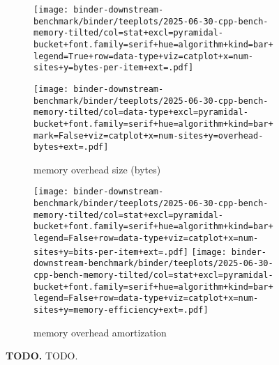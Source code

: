 \begin{figure}


\begin{subfigure}{\linewidth}
\centering
\texttt{[image: binder-downstream-benchmark/binder/teeplots/2025-06-30-cpp-bench-memory-tilted/col=stat+excl=pyramidal-bucket+font.family=serif+hue=algorithm+kind=bar+legend=True+row=data-type+viz=catplot+x=num-sites+y=bytes-per-item+ext=.pdf]}

\texttt{[image: binder-downstream-benchmark/binder/teeplots/2025-06-30-cpp-bench-memory-tilted/col=data-type+excl=pyramidal-bucket+font.family=serif+hue=algorithm+kind=bar+mark=False+viz=catplot+x=num-sites+y=overhead-bytes+ext=.pdf]}

\caption{memory overhead size (bytes)}
\end{subfigure}

\begin{subfigure}{\linewidth}
\texttt{[image: binder-downstream-benchmark/binder/teeplots/2025-06-30-cpp-bench-memory-tilted/col=stat+excl=pyramidal-bucket+font.family=serif+hue=algorithm+kind=bar+legend=False+row=data-type+viz=catplot+x=num-sites+y=bits-per-item+ext=.pdf]}%
\texttt{[image: binder-downstream-benchmark/binder/teeplots/2025-06-30-cpp-bench-memory-tilted/col=stat+excl=pyramidal-bucket+font.family=serif+hue=algorithm+kind=bar+legend=False+row=data-type+viz=catplot+x=num-sites+y=memory-efficiency+ext=.pdf]}
\caption{memory overhead amortization}
\end{subfigure}

\vspace{-2ex}

\caption{%
\textbf{TODO.}
\small
TODO.
}
\label{fig:memory}
\end{figure}
